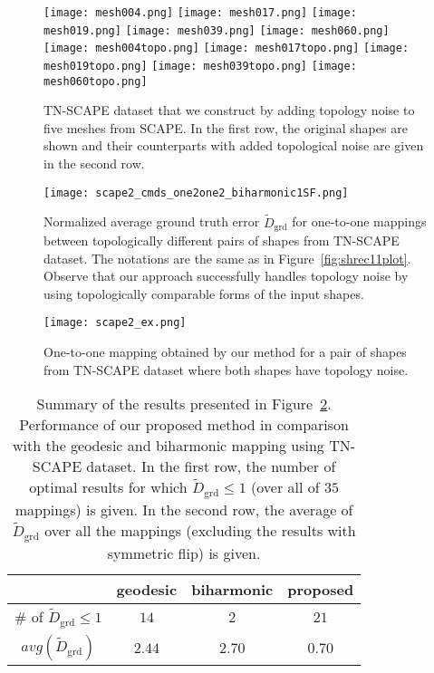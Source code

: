 \begin{figure}[t!]
  \centering
  \texttt{[image: mesh004.png]}
  \texttt{[image: mesh017.png]}
  \texttt{[image: mesh019.png]}
  \texttt{[image: mesh039.png]}
  \texttt{[image: mesh060.png]}\\
  \texttt{[image: mesh004topo.png]}
  \texttt{[image: mesh017topo.png]}
  \texttt{[image: mesh019topo.png]}
  \texttt{[image: mesh039topo.png]}
  \texttt{[image: mesh060topo.png]}
  \caption{\label{fig:scapetopomodels}
  TN-SCAPE dataset that we construct by adding topology noise to five meshes from SCAPE. In the first row, the original shapes are shown and their counterparts with added topological noise are given in the second row.
  }
\end{figure}
\begin{figure}[t!]
  \centering
  \texttt{[image: scape2\_cmds\_one2one2\_biharmonic1SF.png]}
  \caption{\label{fig:scapetopoplot}
  Normalized average ground truth error ${\widetilde{D}_{\mathrm{grd}}}$ for one-to-one mappings between topologically different pairs of shapes from TN-SCAPE dataset. The notations are the same as in Figure~\ref{fig:shrec11plot}. Observe that our approach successfully handles topology noise by using topologically comparable forms of the input shapes.
  }
\end{figure}
\begin{figure}[t]
  \centering
  \texttt{[image: scape2\_ex.png]}
  \caption{\label{fig:scape2ex}
  One-to-one mapping obtained by our method for a pair of shapes from TN-SCAPE dataset where both shapes have topology noise.
  }
\end{figure}
\begin{table}[t]
\centering
\begin{tabular}{|c|c|c|c|}
\hline
 & geodesic & biharmonic & proposed \\
 \hline
 {$\#$ of ${\widetilde{D}_{\mathrm{grd}}} \le 1$} & $14$ & $2$ & $21$ \\
 \hline
 $avg({\widetilde{D}_{\mathrm{grd}}})$ & $2.44$ & $2.70$ & $0.70$\\
 \hline
\end{tabular}
\caption{\label{table:scapetopores}
Summary of the results presented in Figure~\ref{fig:scapetopoplot}. Performance of our proposed method in comparison with the geodesic and biharmonic mapping using TN-SCAPE dataset. In the first row, the number of optimal results for which ${\widetilde{D}_{\mathrm{grd}}}\le 1$ (over all of $35$ mappings) is given. In the second row, the average of ${\widetilde{D}_{\mathrm{grd}}}$ over all the mappings (excluding the results with symmetric flip) is given.
}
\end{table}


